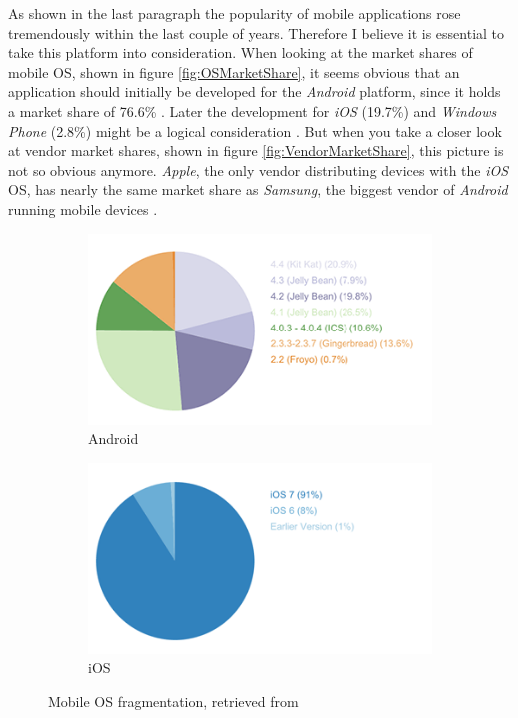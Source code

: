 As shown in the last paragraph the popularity of mobile applications rose tremendously within the last couple of years. Therefore I believe it is essential to take this platform into consideration. When looking at the market shares of mobile \gls{OS}, shown in figure \ref{fig:OSMarketShare}, it seems obvious that an application should initially be developed for the \emph{Android} platform, since it holds a market share of 76.6\% \cite{IDC:2015aa}. Later the development for \emph{iOS} (19.7\%) and \emph{Windows Phone} (2.8\%) might be a logical consideration \cite{IDC:2015aa}. But when you take a closer look at vendor market shares, shown in figure \vref{fig:VendorMarketShare}, this picture is not so obvious anymore. \emph{Apple}, the only vendor distributing devices with the \emph{iOS} \gls{OS}, has nearly the same market share as \emph{Samsung}, the biggest vendor of \emph{Android} running mobile devices \cite{IDC:2015ab}.

\begin{figure}[h]
	\centering
	\begin{subfigure}{.49\textwidth}
  		\centering
  		\includegraphics[width=0.98\linewidth]{./images/android-os.png}
  		\caption{Android}
  		\label{fig:AndroidOSFragmentation}
	\end{subfigure}
	\begin{subfigure}{.49\textwidth}
  		\centering
  		\includegraphics[width=0.98\linewidth]{./images/ios-os.png}
  		\caption{iOS}
  		\label{fig:iOSOSFragmentation}
	\end{subfigure}
	\caption{Mobile \gls{OS} fragmentation, retrieved from \cite{OpenSignal:2014aa}}
	\label{fig:MobileOSFragmentation}
\end{figure}
\nocite{OpenSignal:2014aa}

